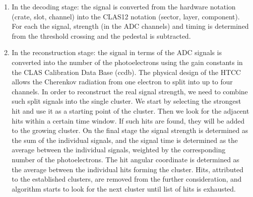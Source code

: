 \begin{enumerate}
    \item In the decoding stage: the signal is converted from the hardware notation (crate, slot, channel) into the CLAS12 notation (sector, layer, component). For each the signal, strength (in the ADC channels) and timing is determined from the threshold crossing and the pedestal is subtracted.
    \item In the reconstruction stage: the signal in terms of the ADC signals is converted into the number of the photoelectrons using the gain constants in the CLAS Calibration Data Base (ccdb). The physical design of the HTCC allows the Cherenkov radiation from one electron to split into up to four channels. In order to reconstruct the real signal strength, we need to combine such split signals into the single cluster. We start by selecting the strongest hit and use it as a starting point of the cluster. Then we look for the adjacent hits within a certain time window. If such hits are found, they will be added to the growing cluster. On the final stage the signal strength is determined as the sum of the individual signals, and the signal time is determined as the average between the individual signals, weighted by the corresponding number of the photoelectrons. The hit angular coordinate is determined as the average between the individual hits forming the cluster. Hits, attributed to the established clusters, are removed from the further consideration, and algorithm starts to look for the next cluster until list of hits is exhausted.
\end{enumerate}